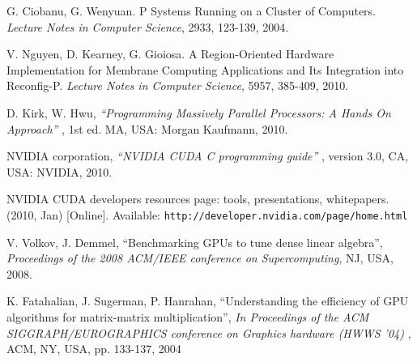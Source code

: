 \documentclass{svmultm}
\begin{document}
\begin{thebibliography}{9999}
 G. Ciobanu, G. Wenyuan. P Systems Running on a Cluster of Computers. \textit{Lecture Notes in Computer Science}, 2933, 123-139, 2004.

 V. Nguyen, D. Kearney, G. Gioiosa. A Region-Oriented Hardware Implementation for Membrane Computing Applications and Its Integration into Reconfig-P. \textit{Lecture Notes in Computer Science}, 5957, 385-409, 2010.


 D. Kirk, W. Hwu, {\it ``Programming Massively Parallel Processors: A Hands On Approach'' }, 1st ed. MA, USA: Morgan Kaufmann, 2010.

 NVIDIA corporation, {\it ``NVIDIA CUDA C programming guide'' }, version 3.0, CA, USA: NVIDIA, 2010.

 NVIDIA CUDA developers resources page: tools, presentations, whitepapers. (2010, Jan) [Online]. Available: {\tt http://developer.nvidia.com/page/home.html }


 V. Volkov, J. Demmel, ``Benchmarking GPUs to tune dense linear algebra'', {\it Proceedings of the 2008 ACM/IEEE conference on Supercomputing}, NJ, USA, 2008.

 K. Fatahalian, J. Sugerman, P. Hanrahan, ``Understanding the efficiency of GPU algorithms for matrix-matrix multiplication'', {\it In Proceedings of the ACM SIGGRAPH/EUROGRAPHICS conference on Graphics hardware (HWWS '04) }, ACM, NY, USA, pp. 133-137, 2004

\end{thebibliography}
\end{document}
